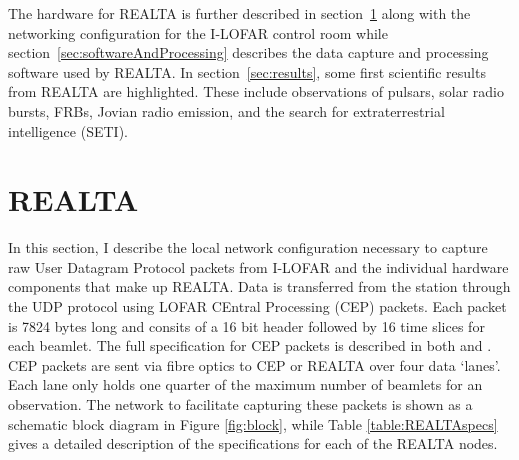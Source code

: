 
The hardware for REALTA is further described in section~\ref{sec:REALTA} along with the networking configuration for the I-LOFAR control room while section~\ref{sec:softwareAndProcessing} describes the data capture and processing software used by REALTA. In section~\ref{sec:results}, some first scientific results from REALTA are highlighted. These include observations of pulsars, solar radio bursts, FRBs, Jovian radio emission, and the search for extraterrestrial intelligence (SETI).  %

\section{REALTA}
\label{sec:REALTA}
In this section, I describe the local network configuration necessary to capture raw User Datagram Protocol \citep[UDP;][]{Postel} packets from I-LOFAR and the individual hardware components that make up REALTA. Data is transferred from the station through the UDP protocol using LOFAR CEntral Processing (CEP) packets. Each packet is 7824 bytes long and consits of a 16 bit header followed by 16 time slices for each beamlet. The full specification for CEP packets is described in both \cite{Lubberhuizen2009} and \citet{Virtanen2018}.  CEP packets are sent via fibre optics to CEP or REALTA over four data `lanes'. Each lane only holds one quarter of the maximum number of beamlets for an observation.
The network to facilitate capturing these packets is shown as a schematic block diagram in Figure \ref{fig:block}, while Table \ref{table:REALTAspecs} gives a detailed description of the specifications for each of the REALTA nodes. 

